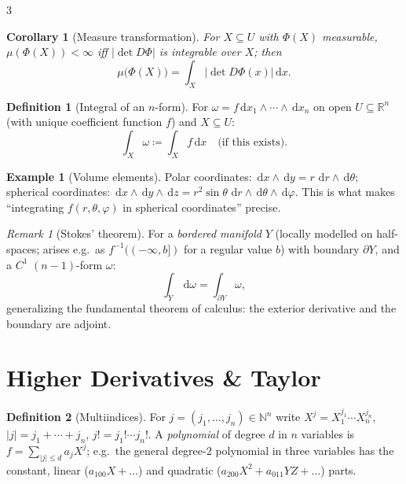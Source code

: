 \documentclass[10pt,a4paper,landscape]{article}
\theoremstyle{definition}
\newtheorem{defn}{Definition}[section]
\newtheorem{exm}{Example}[section]
\theoremstyle{plain}
\newtheorem{cor}{Corollary}[section]
\theoremstyle{remark}
\newtheorem{rem}{Remark}[section]
\newcommand{\R}{\mathbb{R}}
\newcommand{\N}{\mathbb{N}}
\newcommand{\dd}{\,\mathrm{d}}
\newcommand{\abs}[1]{\lvert #1 \rvert}
\newcommand{\oo}{\infty}
\newcommand{\deq}{\coloneqq}
\begin{document}
\begin{multicols*}{3}
\begin{cor}[Measure transformation]
For $X \subseteq U$ with $\Phi(X)$ measurable, $\mu(\Phi(X)) < \oo$ iff $\abs{\det D\Phi}$ is integrable over $X$; then
\[
\mu\bigl(\Phi(X)\bigr) = \int_X \abs{\det D\Phi(x)} \dd x .
\]
\end{cor}

\begin{defn}[Integral of an $n$-form]
For $\omega = f \dd x_1 \wedge \cdots \wedge \dd x_n$ on open $U \subseteq \R^n$ (with unique coefficient function $f$) and $X \subseteq U$:
\[
\int_X \omega \deq \int_X f \dd x \quad \text{(if this exists).}
\]
\end{defn}

\begin{exm}[Volume elements]
Polar coordinates: $\dd x \wedge \dd y = r\,\dd r \wedge \dd\theta$; spherical coordinates: $\dd x \wedge \dd y \wedge \dd z = r^2 \sin\theta\, \dd r \wedge \dd\theta \wedge \dd\varphi$. This is what makes ``integrating $f(r,\theta,\varphi)$ in spherical coordinates'' precise.
\end{exm}

\begin{rem}[Stokes' theorem]
For a \emph{bordered manifold} $Y$ (locally modelled on half-spaces; arises e.g.\ as $f^{-1}((-\oo, b])$ for a regular value $b$) with boundary $\partial Y$, and a $C^1$ $(n-1)$-form $\omega$:
\[
\int_Y \dd\omega = \int_{\partial Y} \omega ,
\]
generalizing the fundamental theorem of calculus: the exterior derivative and the boundary are adjoint.
\end{rem}

\section{Higher Derivatives \& Taylor}

\begin{defn}[Multiindices]
For $j = (j_1, \dots, j_n) \in \N^n$ write $X^j = X_1^{j_1} \cdots X_n^{j_n}$, $\abs{j} = j_1 + \cdots + j_n$, $j! = j_1! \cdots j_n!$. A \emph{polynomial} of degree $d$ in $n$ variables is $f = \sum_{\abs{j} \le d} a_j X^j$; e.g.\ the general degree-$2$ polynomial in three variables has the constant, linear ($a_{100}X + \dots$) and quadratic ($a_{200}X^2 + a_{011}YZ + \dots$) parts.
\end{defn}


\end{multicols*}
\end{document}
